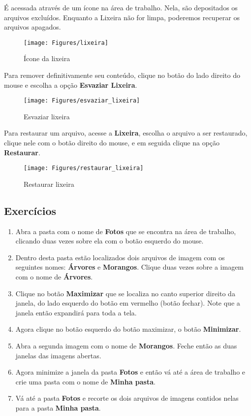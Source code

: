 \documentclass[hidelinks,12pt]{article}
\begin{document}
É acessada através de um ícone na área de trabalho. Nela, são depositados os arquivos excluídos. Enquanto a Lixeira não for limpa, poderemos recuperar os arquivos apagados.

\begin{figure}[!h]
	\centering
	\texttt{[image: Figures/lixeira]}
	\caption{Ícone da lixeira}
	\label{fig:lixeira}
\end{figure}

Para remover definitivamente seu conteúdo, clique no botão do lado direito do mouse e escolha a opção {\bf Esvaziar Lixeira}.

\begin{figure}[!h]
	\centering
	\texttt{[image: Figures/esvaziar\_lixeira]}
	\caption{Esvaziar lixeira}
	\label{fig:esvaziar_lixeira}
\end{figure}

Para restaurar um arquivo, acesse a {\bf Lixeira}, escolha o arquivo a ser restaurado, clique nele com o botão direito do mouse, e em seguida clique na opção {\bf Restaurar}.

\begin{figure}[!h]
	\centering
	\texttt{[image: Figures/restaurar\_lixeira]}
	\caption{Restaurar lixeira}
	\label{fig: restaurar_lixeira}
\end{figure}

\subsection{Exercícios}

\begin{enumerate}
	\item Abra a pasta com o nome de {\bf Fotos} que se encontra na área de trabalho, clicando duas vezes sobre ela com o botão esquerdo do mouse.


	\item Dentro desta pasta estão localizados dois arquivos de imagem com os seguintes nomes: {\bf Árvores} e {\bf Morangos}. Clique duas vezes sobre a imagem com o nome de {\bf Árvores}.

	\item Clique no botão {\bf Maximizar} que se localiza no canto superior direito da janela, do lado esquerdo do botão em vermelho (botão fechar). Note que a janela então expandirá para toda a tela.

	\item Agora clique no botão esquerdo do botão maximizar, o botão {\bf Minimizar}.

	\item Abra a segunda imagem com o nome de {\bf Morangos}. Feche então as duas janelas das imagens abertas.

	\item Agora minimize a janela da pasta {\bf Fotos} e então vá até a área de trabalho e crie uma pasta com o nome de {\bf Minha pasta}.

	\item Vá até a pasta {\bf Fotos} e recorte os dois arquivos de imagens contidos nelas para a pasta {\bf Minha pasta}.

\end{enumerate}
\end{document}
